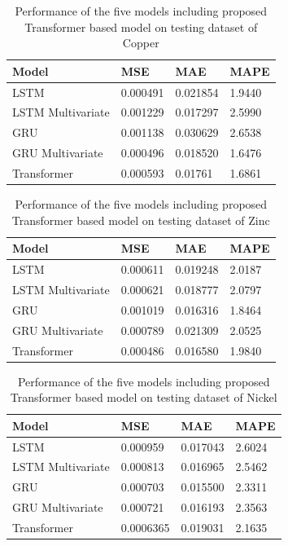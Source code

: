 \documentclass{ws-ijait}
\begin{document}
\begin{table}[!htbp]
	\begin{center}
		\begin{tabular}{ p{3cm}|p{3cm}|p{3cm}|p{3cm} } \hline
			
			\textbf{Model}& \textbf{MSE}&\textbf{MAE}&\textbf{MAPE}\\ \hline 
			LSTM&0.000491 &0.021854& 1.9440\\ \hline 
			LSTM Multivariate&0.001229 &0.017297&2.5990\\ \hline
			GRU&0.001138 &0.030629&2.6538\\ \hline
			GRU Multivariate&0.000496 &0.018520&1.6476\\ \hline
			Transformer&0.000593 &0.01761&1.6861\\ \hline
		\end{tabular}
		\caption{Performance of the five models including proposed Transformer based model on testing dataset of Copper} \label{tab3}
	\end{center}
\end{table}

\begin{table}[!htbp]
	\begin{center}
		\begin{tabular}{ p{3cm}|p{3cm}|p{3cm}|p{3cm} } \hline
			
			\textbf{Model}& \textbf{MSE}&\textbf{MAE}&\textbf{MAPE}\\ \hline 
			LSTM&0.000611 &0.019248& 2.0187\\ \hline 
			LSTM Multivariate&0.000621 &0.018777&2.0797\\ \hline
			GRU&0.001019 &0.016316&1.8464\\ \hline
			GRU Multivariate&0.000789 &0.021309&2.0525\\ \hline
			Transformer&0.000486 &0.016580&1.9840\\ \hline
		\end{tabular}
		\caption{Performance of the five models including proposed Transformer based model on testing dataset of Zinc} \label{tab4}
	\end{center}
\end{table}

\begin{table}[!htbp]
	\begin{center}
		\begin{tabular}{ p{3cm}|p{3cm}|p{3cm}|p{3cm} } \hline
			\textbf{Model}& \textbf{MSE}&\textbf{MAE}&\textbf{MAPE}\\ \hline 
			LSTM&0.000959 &0.017043& 2.6024\\ \hline 
			LSTM Multivariate&0.000813 &0.016965&2.5462\\ \hline
			GRU&0.000703 &0.015500&2.3311\\ \hline
			GRU Multivariate&0.000721 &0.016193&2.3563\\ \hline
			Transformer&0.0006365 &0.019031&2.1635\\ \hline
		\end{tabular}
		\caption{Performance of the five models including proposed Transformer based model on testing dataset of Nickel} \label{tab5}
	\end{center}
\end{table}
\end{document}
